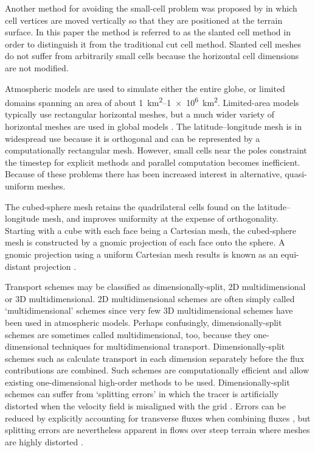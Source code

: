 Another method for avoiding the small-cell problem was proposed by \citep{shaw-weller2016} in which cell vertices are moved vertically so that they are positioned at the terrain surface.  In this paper the method is referred to as the slanted cell method in order to distinguish it from the traditional cut cell method.  Slanted cell meshes do not suffer from arbitrarily small cells because the horizontal cell dimensions are not modified.

Atmospheric models are used to simulate either the entire globe, or limited domains spanning an area of about \SIrange{1}{1e6}{\kilo\meter\squared}.  Limited-area models typically use rectangular horizontal meshes, but a much wider variety of horizontal meshes are used in global models \citep{staniforth-thuburn2012}.  The latitude--longitude mesh is in widespread use because it is orthogonal and can be represented by a computationally rectangular mesh.  However, small cells near the poles constraint the timestep for explicit methods and parallel computation becomes inefficient.  Because of these problems there has been increased interest in alternative, quasi-uniform meshes.

The cubed-sphere mesh retains the quadrilateral cells found on the latitude--longitude mesh, and improves uniformity at the expense of orthogonality.  Starting with a cube with each face being a Cartesian mesh, the cubed-sphere mesh is constructed by a gnomic projection of each face onto the sphere.  A gnomic projection using a uniform Cartesian mesh results is known as an equi-distant projection \citep{staniforth-thuburn2012}.



Transport schemes may be classified as dimensionally-split, 2D multidimensional or 3D multidimensional.  2D multidimensional schemes are often simply called `multidimensional' schemes since very few 3D multidimensional schemes have been used in atmospheric models.
Perhaps confusingly, dimensionally-split schemes are sometimes called multidimensional, too, because they one-dimensional techniques for multidimensional transport.
Dimensionally-split schemes such as \citep{lin-rood1996,putman-lin2007,katta2015} calculate transport in each dimension separately before the flux contributions are combined.  Such schemes are computationally efficient and allow existing one-dimensional high-order methods to be used.
  Dimensionally-split schemes can suffer from `splitting errors' in which the tracer is artificially distorted when the velocity field is misaligned with the grid \citep{leonard1993}.  Errors can be reduced by explicitly accounting for transverse fluxes when combining fluxes \citep{leonard1996}, but splitting errors are nevertheless apparent in flows over steep terrain where meshes are highly distorted \citep{weller2017}.


